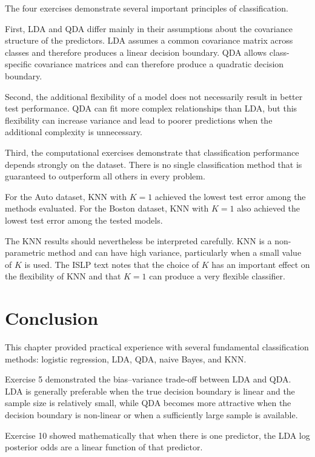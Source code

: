 \documentclass[12pt,a4paper]{article}
\begin{document}
The four exercises demonstrate several important principles of
classification.

First, LDA and QDA differ mainly in their assumptions about the covariance
structure of the predictors. LDA assumes a common covariance matrix across
classes and therefore produces a linear decision boundary. QDA allows
class-specific covariance matrices and can therefore produce a quadratic
decision boundary.

Second, the additional flexibility of a model does not necessarily result in
better test performance. QDA can fit more complex relationships than LDA,
but this flexibility can increase variance and lead to poorer predictions
when the additional complexity is unnecessary.

Third, the computational exercises demonstrate that classification
performance depends strongly on the dataset. There is no single
classification method that is guaranteed to outperform all others in every
problem.

For the Auto dataset, KNN with $K=1$ achieved the lowest test error among the
methods evaluated. For the Boston dataset, KNN with $K=1$ also achieved the
lowest test error among the tested models.

The KNN results should nevertheless be interpreted carefully. KNN is a
non-parametric method and can have high variance, particularly when a small
value of $K$ is used. The ISLP text notes that the choice of $K$ has an
important effect on the flexibility of KNN and that $K=1$ can produce a very
flexible classifier.


\section{Conclusion}

This chapter provided practical experience with several fundamental
classification methods: logistic regression, LDA, QDA, naive Bayes, and
KNN.

Exercise 5 demonstrated the bias--variance trade-off between LDA and QDA.
LDA is generally preferable when the true decision boundary is linear and
the sample size is relatively small, while QDA becomes more attractive when
the decision boundary is non-linear or when a sufficiently large sample is
available.

Exercise 10 showed mathematically that when there is one predictor, the LDA
log posterior odds are a linear function of that predictor.
\end{document}
